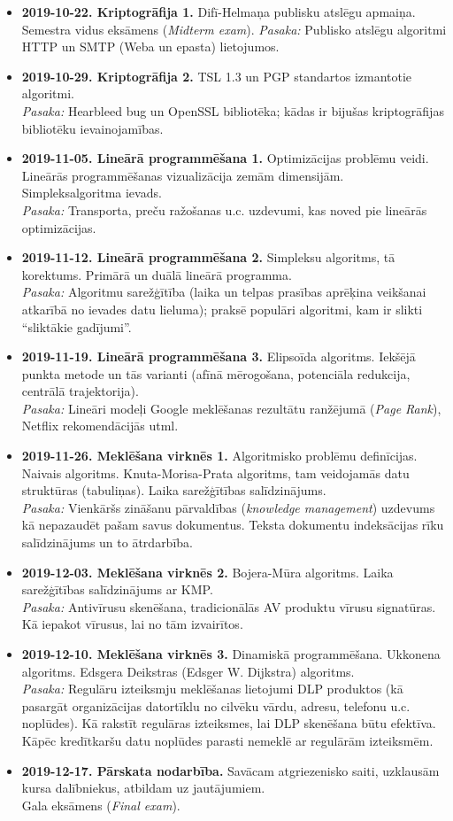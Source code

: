 \documentclass[11pt]{article}
\begin{document}
\begin{itemize}
\item {\bf 2019-10-22. Kriptogrāfija \textendash{} 1.} 
Difī-Helmaņa publisku atslēgu apmaiņa. Semestra vidus eksāmens ({\em Midterm exam}).
{\em Pasaka:} Publisko atslēgu algoritmi HTTP un SMTP (Weba un epasta) lietojumos.
\item {\bf 2019-10-29. Kriptogrāfija \textendash{} 2.} TSL 1.3 un PGP standartos izmantotie algoritmi.\\
{\em Pasaka:} Hearbleed bug un OpenSSL bibliotēka; kādas ir bijušas kriptogrāfijas bibliotēku ievainojamības.
\item {\bf 2019-11-05. Lineārā programmēšana \textendash{} 1.} Optimizācijas problēmu veidi. 
Lineārās programmēšanas vizualizācija zemām dimensijām. Simpleksalgoritma ievads.\\
{\em Pasaka:} 
Transporta, preču ražošanas u.c. uzdevumi, kas noved pie lineārās optimizācijas.
\item {\bf 2019-11-12. Lineārā programmēšana \textendash{} 2.} Simpleksu algoritms, tā korektums. 
Primārā un duālā lineārā programma.\\
{\em Pasaka:} Algoritmu sarežģītība (laika un telpas prasības aprēķina veikšanai atkarībā 
no ievades datu lieluma); praksē populāri algoritmi, kam ir slikti “sliktākie gadījumi”.
\item {\bf 2019-11-19. Lineārā programmēšana \textendash{} 3.} Elipsoīda algoritms. Iekšējā punkta metode un tās varianti 
(afīnā mērogošana, potenciāla redukcija, centrālā trajektorija).\\
{\em Pasaka:} Lineāri modeļi Google meklēšanas rezultātu ranžējumā ({\em Page Rank}), 
Netflix rekomendācijās utml.
\item {\bf 2019-11-26. Meklēšana virknēs \textendash{} 1.} 
Algoritmisko problēmu definīcijas. Naivais algoritms. Knuta-Morisa-Prata algoritms, 
tam veidojamās datu struktūras (tabuliņas). Laika sarežģītības salīdzinājums.\\
{\em Pasaka:} Vienkāršs zināšanu pārvaldības ({\em knowledge management}) uzdevums \textendash{} 
kā nepazaudēt pašam savus dokumentus. Teksta dokumentu indeksācijas rīku salīdzinājums un to ātrdarbība.
\item {\bf 2019-12-03. Meklēšana virknēs \textendash{} 2.} 
Bojera-Mūra algoritms. Laika sarežģītības salīdzinājums ar KMP.\\
{\em Pasaka:} Antivīrusu skenēšana, tradicionālās AV produktu vīrusu signatūras. 
Kā iepakot vīrusus, lai no tām izvairītos.
\item {\bf 2019-12-10. Meklēšana virknēs \textendash{} 3.} Dinamiskā programmēšana. Ukkonena algoritms. 
Edsgera Deikstras (Edsger W. Dijkstra) algoritms.\\
{\em Pasaka:} Regulāru izteiksmju meklēšanas lietojumi DLP produktos (kā pasargāt organizācijas datortīklu no 
cilvēku vārdu, adresu, telefonu u.c. noplūdes). Kā rakstīt regulāras izteiksmes, lai DLP skenēšana būtu efektīva. 
Kāpēc kredītkaršu datu noplūdes parasti nemeklē ar regulārām izteiksmēm.
\item {\bf 2019-12-17. Pārskata nodarbība.} Savācam atgriezenisko saiti, uzklausām kursa dalībniekus, atbildam uz jautājumiem.\\
Gala eksāmens ({\em Final exam}).
\end{itemize}
\end{document}
